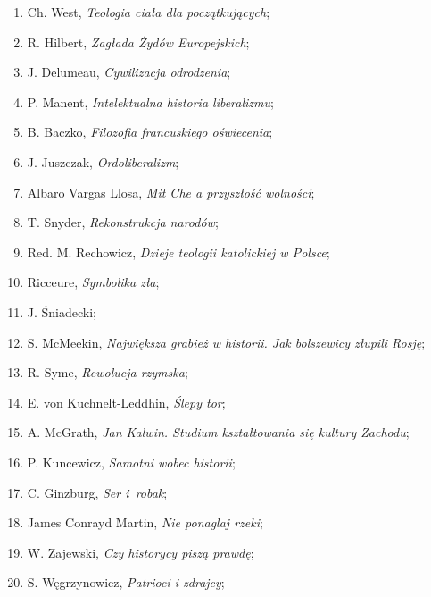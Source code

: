 \documentclass[a4paper,11pt]{article}
\begin{document}
\begin{enumerate}
\item Ch. West, \emph{Teologia ciała dla początkujących};

\item R. Hilbert, \emph{Zagłada Żydów Europejskich};

\item J. Delumeau, \emph{Cywilizacja odrodzenia};

\item P. Manent, \emph{Intelektualna historia liberalizmu};

\item B. Baczko, \emph{Filozofia francuskiego oświecenia};

\item J. Juszczak, \emph{Ordoliberalizm};

\item Albaro Vargas Llosa, \emph{Mit Che a przyszłość wolności};

\item T. Snyder, \emph{Rekonstrukcja narodów};

\item Red. M. Rechowicz, \emph{Dzieje teologii katolickiej w Polsce};

\item Ricceure, \emph{Symbolika zła};

\item J. Śniadecki;

\item S. McMeekin, \emph{Największa grabież w historii. Jak bolszewicy
    złupili Rosję};

\item R. Syme, \emph{Rewolucja rzymska};

\item E. von Kuchnelt-Leddhin, \emph{Ślepy tor};

\item A. McGrath, \emph{Jan Kalwin. Studium kształtowania się kultury
    Zachodu};

\item P. Kuncewicz, \emph{Samotni wobec historii};

\item C. Ginzburg, \emph{Ser i~robak};

\item James Conrayd Martin, \emph{Nie ponaglaj rzeki};

\item W. Zajewski, \emph{Czy historycy piszą prawdę};

\item S. Węgrzynowicz, \emph{Patrioci i zdrajcy};


\end{enumerate}
\end{document}
